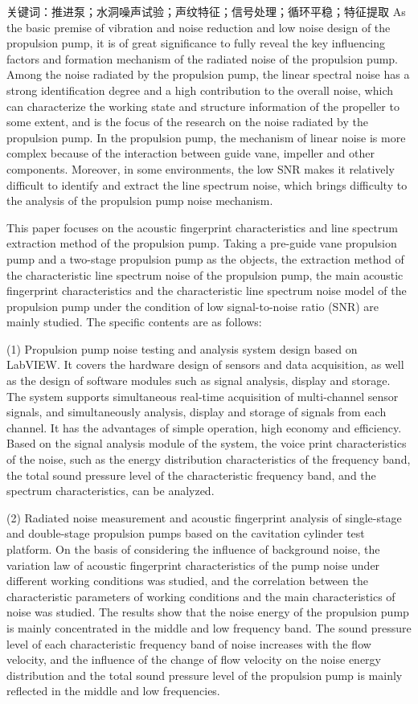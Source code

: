 关键词：推进泵；水洞噪声试验；声纹特征；信号处理；循环平稳；特征提取
\cleardoublepage
{}
As the basic premise of vibration and noise reduction and low noise design of the propulsion pump, it is of great significance to fully reveal the key influencing factors and formation mechanism of the radiated noise of the propulsion pump. Among the noise radiated by the propulsion pump, the linear spectral noise has a strong identification degree and a high contribution to the overall noise, which can characterize the working state and structure information of the propeller to some extent, and is the focus of the research on the noise radiated by the propulsion pump. In the propulsion pump, the mechanism of linear noise is more complex because of the interaction between guide vane, impeller and other components. Moreover, in some environments, the low SNR makes it relatively difficult to identify and extract the line spectrum noise, which brings difficulty to the analysis of the propulsion pump noise mechanism.

This paper focuses on the acoustic fingerprint characteristics and line spectrum extraction method of the propulsion pump. Taking a pre-guide vane propulsion pump and a two-stage propulsion pump as the objects, the extraction method of the characteristic line spectrum noise of the propulsion pump, the main acoustic fingerprint characteristics and the characteristic line spectrum noise model of the propulsion pump under the condition of low signal-to-noise ratio (SNR) are mainly studied. The specific contents are as follows:

(1) Propulsion pump noise testing and analysis system design based on LabVIEW. It covers the hardware design of sensors and data acquisition, as well as the design of software modules such as signal analysis, display and storage. The system supports simultaneous real-time acquisition of multi-channel sensor signals, and simultaneously analysis, display and storage of signals from each channel. It has the advantages of simple operation, high economy and efficiency. Based on the signal analysis module of the system, the voice print characteristics of the noise, such as the energy distribution characteristics of the frequency band, the total sound pressure level of the characteristic frequency band, and the spectrum characteristics, can be analyzed.

(2) Radiated noise measurement and acoustic fingerprint analysis of single-stage and double-stage propulsion pumps based on the cavitation cylinder test platform. On the basis of considering the influence of background noise, the variation law of acoustic fingerprint characteristics of the pump noise under different working conditions was studied, and the correlation between the characteristic parameters of working conditions and the main characteristics of noise was studied. The results show that the noise energy of the propulsion pump is mainly concentrated in the middle and low frequency band. The sound pressure level of each characteristic frequency band of noise increases with the flow velocity, and the influence of the change of flow velocity on the noise energy distribution and the total sound pressure level of the propulsion pump is mainly reflected in the middle and low frequencies.

